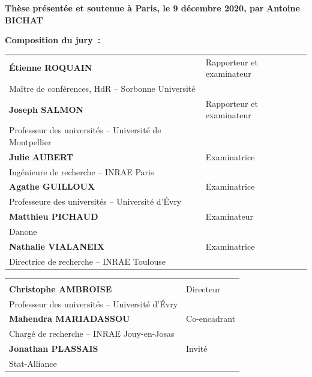 \documentclass[12pt,a4paper]{reedthesis}
\theoremstyle{definition}
\theoremstyle{definition}
\theoremstyle{definition}
\theoremstyle{remark}
\begin{document}
\begin{titlepage}
\vspace{10mm}

\textbf{Thèse présentée et soutenue à Paris, le 9 décembre 2020, par}
\bigskip
\Large {\color{Prune} \textbf{Antoine BICHAT}}


\vspace{15mm}


\flushleft \normalsize \textbf{Composition du jury~:}
\bigskip


\scriptsize
\begin{tabular}{|p{8cm}l}
\arrayrulecolor{Prune}
\textbf{Étienne ROQUAIN} &  Rapporteur et examinateur\\
Maître de conférences, HdR -- Sorbonne Université & \\
\textbf{Joseph SALMON} &  Rapporteur et examinateur\\
Professeur des universités -- Université de Montpellier & \\
\textbf{Julie AUBERT} &  Examinatrice\\
Ingénieure de recherche -- INRAE Paris & \\
\textbf{Agathe GUILLOUX} &  Examinatrice\\
Professeure des universités -- Université d'Évry & \\
\textbf{Matthieu PICHAUD} &  Examinateur\\
Danone & \\
\textbf{Nathalie VIALANEIX} &  Examinatrice\\
Directrice de recherche -- INRAE Toulouse & \\
\end{tabular}
\begin{tabular}{p{8cm}l}
& \\
\textbf{Christophe AMBROISE} &  Directeur\\
Professeur des universités -- Université d'Évry & \\
\textbf{Mahendra MARIADASSOU} &  Co-encadrant\\
Chargé de recherche -- INRAE Jouy-en-Josas & \\
\textbf{Jonathan PLASSAIS} &  Invité\\
Stat-Alliance & \\
\end{tabular}
\end{titlepage}
\frontmatter %
\pagestyle{empty} %
\end{document}
